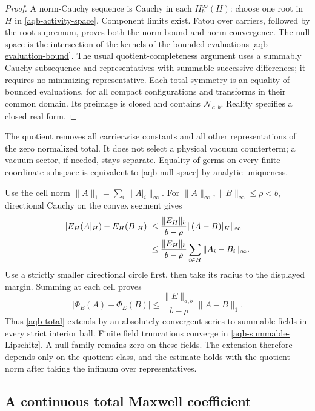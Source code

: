 \begin{proof}
A norm-Cauchy sequence is Cauchy in each $H^\infty_b(H)$:
choose one root in $H$ in \eqref{aqb-activity-space}. Component
limits exist. Fatou over carriers, followed by the root supremum,
proves both the norm bound and norm convergence. The null space
is the intersection of the kernels of the bounded evaluations
\eqref{aqb-evaluation-bound}. The usual quotient-completeness
argument uses a summably Cauchy subsequence and representatives
with summable successive differences; it requires no minimizing
representative. Each total symmetry is an equality of bounded
evaluations, for all compact configurations and transforms in
their common domain. Its preimage is closed and contains
$\mathcal N_{a,b}$. Reality specifies a closed real form.
\end{proof}

The quotient removes all carrierwise constants and all other
representations of the zero normalized total. It does not select
a physical vacuum counterterm; a vacuum sector, if needed, stays
separate. Equality of germs on every finite-coordinate subspace
is equivalent to \eqref{aqb-null-space} by analytic uniqueness.

Use the cell norm $\|A\|_1=\sum_i\|A|_i\|_\infty$.
For $\|A\|_\infty,\|B\|_\infty\le\rho<b$, directional
Cauchy on the convex segment gives
\begin{align}
 |E_H(A|_H)-E_H(B|_H)|
 &\le\frac{\|E_H\|_b}{b-\rho}
                          \|(A-B)|_H\|_\infty\notag\\
 &\le\frac{\|E_H\|_b}{b-\rho}
                          \sum_{i\in H}\|A_i-B_i\|_\infty.
 \label{aqb-local-Lipschitz}
\end{align}
Use a strictly smaller directional circle first, then take its
radius to the displayed margin. Summing at each cell proves
\begin{equation}
 |\Phi_E(A)-\Phi_E(B)|
       \le\frac{\|E\|_{a,b}}{b-\rho}\|A-B\|_1.
 \label{aqb-summable-Lipschitz}
\end{equation}
Thus \eqref{aqb-total} extends by an absolutely convergent series
to summable fields in every strict interior ball. Finite field
truncations converge in \eqref{aqb-summable-Lipschitz}. A null
family remains zero on these fields. The extension therefore
depends only on the quotient class, and the estimate holds with
the quotient norm after taking the infimum over representatives.

\subsection{A continuous total Maxwell coefficient}
\label{aqb-beta-section}

